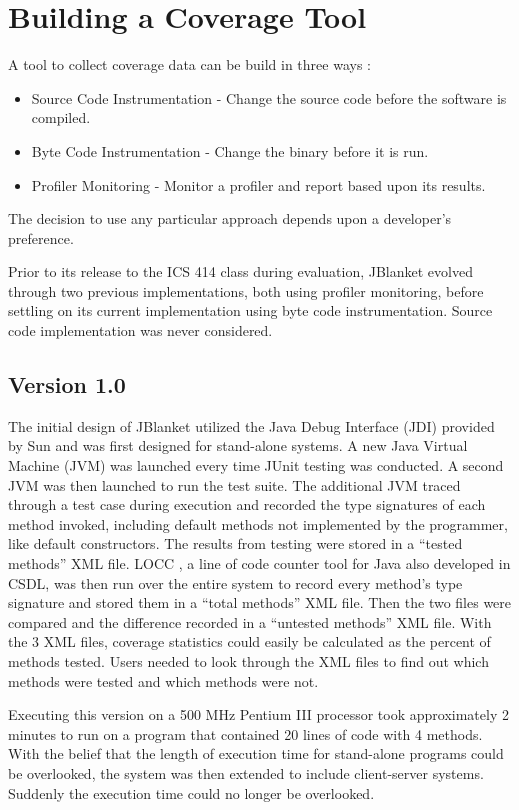 \section{Building a Coverage Tool}
A tool to collect coverage data can be build in three ways \cite{Quilt}:

\begin{itemize}
\item Source Code Instrumentation - Change the source code before the
software is compiled.
\item Byte Code Instrumentation - Change the binary before it is run.
\item Profiler Monitoring - Monitor a profiler and report based upon its
results.
\end{itemize}
The decision to use any particular approach depends upon a developer's
preference.

Prior to its release to the ICS 414 class during evaluation, JBlanket
evolved through two previous implementations, both using profiler
monitoring, before settling on its current implementation using byte code
instrumentation.  Source code implementation was never considered.

\subsection{Version 1.0}
The initial design of JBlanket utilized the Java Debug Interface (JDI)
provided by Sun and was first designed for stand-alone systems.  A new Java
Virtual Machine (JVM) was launched every time JUnit testing was conducted.
A second JVM was then launched to run the test suite.  The additional JVM
traced through a test case during execution and recorded the type
signatures of each method invoked, including default methods not
implemented by the programmer, like default constructors.  The results from
testing were stored in a ``tested methods'' XML file.  LOCC \cite{LOCC}, a
line of code counter tool for Java also developed in CSDL, was then run
over the entire system to record every method's type signature and stored
them in a ``total methods'' XML file.  Then the two files were compared and
the difference recorded in a ``untested methods'' XML file.  With the 3 XML
files, coverage statistics could easily be calculated as the percent of
methods tested.  Users needed to look through the XML files to find out
which methods were tested and which methods were not.

Executing this version on a 500 MHz Pentium III processor took
approximately 2 minutes to run on a program that contained 20 lines of code
with 4 methods.  With the belief that the length of execution time for
stand-alone programs could be overlooked, the system was then extended to
include client-server systems.  Suddenly the execution time could no longer
be overlooked.

